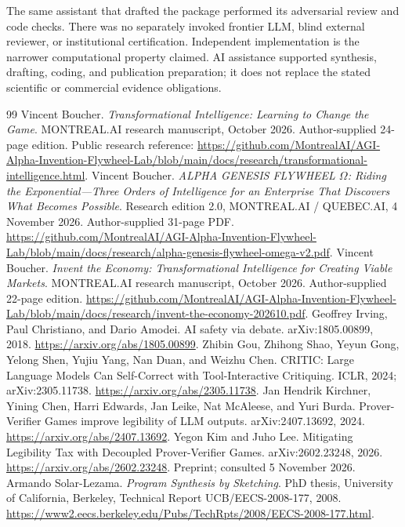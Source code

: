 \documentclass[11pt,a4paper]{article}
\begin{document}
The same assistant that drafted the package performed its adversarial review and code checks. There was no separately invoked frontier LLM, blind external reviewer, or institutional certification. Independent implementation is the narrower computational property claimed. AI assistance supported synthesis, drafting, coding, and publication preparation; it does not replace the stated scientific or commercial evidence obligations.

\clearpage
\begin{thebibliography}{99}\footnotesize
\setlength{\itemsep}{3pt}
\setlength{\parskip}{0pt}
 Vincent Boucher. \emph{Transformational Intelligence: Learning to Change the Game}. MONTREAL.AI research manuscript, October 2026. Author-supplied 24-page edition. Public research reference: \url{https://github.com/MontrealAI/AGI-Alpha-Invention-Flywheel-Lab/blob/main/docs/research/transformational-intelligence.html}.
 Vincent Boucher. \emph{ALPHA GENESIS FLYWHEEL $\Omega$: Riding the Exponential---Three Orders of Intelligence for an Enterprise That Discovers What Becomes Possible}. Research edition 2.0, MONTREAL.AI / QUEBEC.AI, 4 November 2026. Author-supplied 31-page PDF. \url{https://github.com/MontrealAI/AGI-Alpha-Invention-Flywheel-Lab/blob/main/docs/research/alpha-genesis-flywheel-omega-v2.pdf}.
 Vincent Boucher. \emph{Invent the Economy: Transformational Intelligence for Creating Viable Markets}. MONTREAL.AI research manuscript, October 2026. Author-supplied 22-page edition. \url{https://github.com/MontrealAI/AGI-Alpha-Invention-Flywheel-Lab/blob/main/docs/research/invent-the-economy-202610.pdf}.
 Geoffrey Irving, Paul Christiano, and Dario Amodei. AI safety via debate. arXiv:1805.00899, 2018. \url{https://arxiv.org/abs/1805.00899}.
 Zhibin Gou, Zhihong Shao, Yeyun Gong, Yelong Shen, Yujiu Yang, Nan Duan, and Weizhu Chen. CRITIC: Large Language Models Can Self-Correct with Tool-Interactive Critiquing. ICLR, 2024; arXiv:2305.11738. \url{https://arxiv.org/abs/2305.11738}.
 Jan Hendrik Kirchner, Yining Chen, Harri Edwards, Jan Leike, Nat McAleese, and Yuri Burda. Prover-Verifier Games improve legibility of LLM outputs. arXiv:2407.13692, 2024. \url{https://arxiv.org/abs/2407.13692}.
 Yegon Kim and Juho Lee. Mitigating Legibility Tax with Decoupled Prover-Verifier Games. arXiv:2602.23248, 2026. \url{https://arxiv.org/abs/2602.23248}. Preprint; consulted 5 November 2026.
 Armando Solar-Lezama. \emph{Program Synthesis by Sketching}. PhD thesis, University of California, Berkeley, Technical Report UCB/EECS-2008-177, 2008. \url{https://www2.eecs.berkeley.edu/Pubs/TechRpts/2008/EECS-2008-177.html}.

\end{thebibliography}
\end{document}
